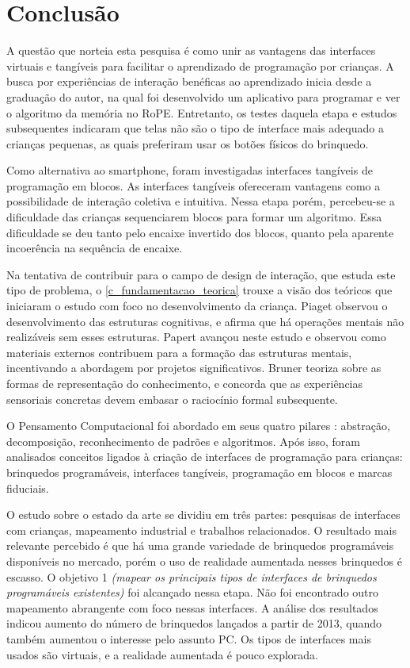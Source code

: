 \chapter{Conclusão}
\label{c_conclusao}

A questão que norteia esta pesquisa é como unir as vantagens das interfaces virtuais e tangíveis para facilitar o aprendizado de programação por crianças. A busca por experiências de interação benéficas ao aprendizado inicia desde a graduação do autor, na qual foi desenvolvido um aplicativo para programar e ver o algoritmo da memória no RoPE. Entretanto, os testes daquela etapa e estudos subsequentes indicaram que telas não são o tipo de interface mais adequado a crianças pequenas, as quais preferiram usar os botões físicos do brinquedo.

Como alternativa ao smartphone, foram investigadas interfaces tangíveis de programação em blocos. As interfaces tangíveis ofereceram vantagens como a possibilidade de interação coletiva e intuitiva. Nessa etapa porém, percebeu-se a dificuldade das crianças sequenciarem blocos para formar um algoritmo. Essa dificuldade se deu tanto pelo encaixe invertido dos blocos, quanto pela aparente incoerência na sequência de encaixe.

Na tentativa de contribuir para o campo de design de interação, que estuda este tipo de problema, o \autoref{c_fundamentacao_teorica} trouxe a visão dos teóricos que iniciaram o estudo com foco no desenvolvimento da criança. Piaget observou o desenvolvimento das estruturas cognitivas, e afirma que há operações mentais não realizáveis sem esses estruturas. Papert avançou neste estudo e observou como materiais externos contribuem para a formação das estruturas mentais, incentivando a abordagem por projetos significativos. Bruner teoriza sobre as formas de representação do conhecimento, e concorda que as experiências sensoriais concretas devem embasar o raciocínio formal subsequente.

O Pensamento Computacional foi abordado em seus quatro pilares \cite{brackmann_desenvolvimento_2017}: abstração, decomposição, reconhecimento de padrões e algoritmos. Após isso, foram analisados conceitos ligados à criação de interfaces de programação para crianças: brinquedos programáveis, interfaces tangíveis, programação em blocos e marcas fiduciais.

O estudo sobre o estado da arte se dividiu em três partes: pesquisas de interfaces com crianças, mapeamento industrial e trabalhos relacionados. O resultado mais relevante percebido é que há uma grande variedade de brinquedos programáveis disponíveis no mercado, porém o uso de realidade aumentada nesses brinquedos é escasso. 
O objetivo 1 \textit{(mapear os principais tipos de interfaces de brinquedos programáveis existentes)} foi alcançado nessa etapa. Não foi encontrado outro mapeamento abrangente com foco nessas interfaces. A análise dos resultados indicou aumento do número de brinquedos lançados a partir de 2013, quando também aumentou o interesse pelo assunto \acl{PC}. Os tipos de interfaces mais usados são virtuais, e a realidade aumentada é pouco explorada.

